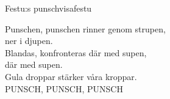 \begin{song}{Festu:s punschvisa}{festu}
\begin{vers}
Punschen, punschen rinner genom strupen,\\
ner i djupen.\\
Blandas, konfronteras där med supen,\\
där med supen.\\
Gula droppar stärker våra kroppar.\\
PUNSCH, PUNSCH, PUNSCH\\
\end{vers}
\end{song}
